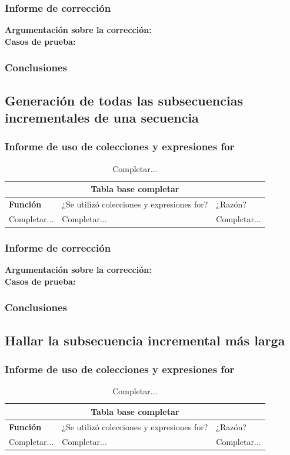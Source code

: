 \documentclass[12pt, a4paper]{article}
\begin{document}
\subsubsection{Informe de corrección}
\textbf{Argumentación sobre la corrección: \\}
\textbf{Casos de prueba: \\}
\subsubsection{Conclusiones}
\subsection{Generación de todas las subsecuencias incrementales de una secuencia}
\subsubsection{Informe de uso de colecciones y expresiones for}
\begin{table}[H]
    \scriptsize
   \begin{tabular}{ |p{4cm}|p{3cm}|p{5.5cm}|  }
    \hline
    \multicolumn{3}{|c|}{Tabla base completar} \\
    \hline
    \textbf{Función}& ¿Se utilizó colecciones y expresiones for?  & ¿Razón?\\
    \hline
     Completar... & Completar... &  Completar... \\
     \hline
   \end{tabular}
   \centering
   \caption{Completar...}
   \end{table}
\subsubsection{Informe de corrección}
\textbf{Argumentación sobre la corrección: \\}
\textbf{Casos de prueba: \\}
\subsubsection{Conclusiones}
\subsection{Hallar la subsecuencia incremental más larga}
\subsubsection{Informe de uso de colecciones y expresiones for}
\begin{table}[H]
    \scriptsize
   \begin{tabular}{ |p{4cm}|p{3cm}|p{5.5cm}|  }
    \hline
    \multicolumn{3}{|c|}{Tabla base completar} \\
    \hline
    \textbf{Función}& ¿Se utilizó colecciones y expresiones for?  & ¿Razón?\\
    \hline
     Completar... & Completar... &  Completar... \\
     \hline
   \end{tabular}
   \centering
   \caption{Completar...}
   \end{table}
\end{document}
